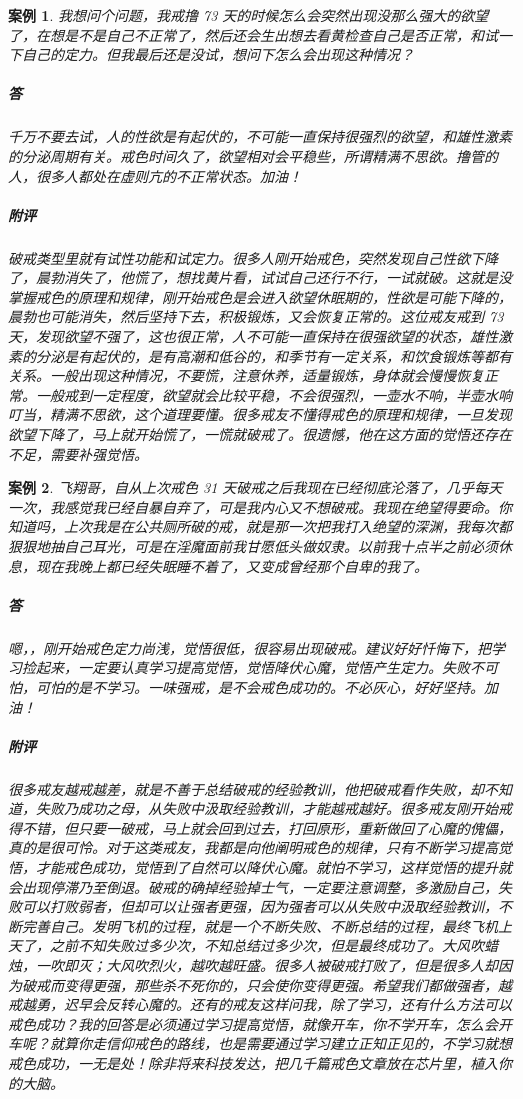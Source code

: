\documentclass{ctexart}
\newtheorem{case}{案例}
\begin{document}
\begin{case}
    我想问个问题，我戒撸 73 天的时候怎么会突然出现没那么强大的欲望了，在想是不是自己不正常了，然后还会生出想去看黄检查自己是否正常，和试一下自己的定力。但我最后还是没试，想问下怎么会出现这种情况？
    \subparagraph{答} 千万不要去试，人的性欲是有起伏的，不可能一直保持很强烈的欲望，和雄性激素的分泌周期有关。戒色时间久了，欲望相对会平稳些，所谓精满不思欲。撸管的人，很多人都处在虚则亢的不正常状态。加油！
    \subparagraph{附评} 破戒类型里就有试性功能和试定力。很多人刚开始戒色，突然发现自己性欲下降了，晨勃消失了，他慌了，想找黄片看，试试自己还行不行，一试就破。这就是没掌握戒色的原理和规律，刚开始戒色是会进入欲望休眠期的，性欲是可能下降的，晨勃也可能消失，然后坚持下去，积极锻炼，又会恢复正常的。这位戒友戒到 73 天，发现欲望不强了，这也很正常，人不可能一直保持在很强欲望的状态，雄性激素的分泌是有起伏的，是有高潮和低谷的，和季节有一定关系，和饮食锻炼等都有关系。一般出现这种情况，不要慌，注意休养，适量锻炼，身体就会慢慢恢复正常。一般戒到一定程度，欲望就会比较平稳，不会很强烈，一壶水不响，半壶水响叮当，精满不思欲，这个道理要懂。很多戒友不懂得戒色的原理和规律，一旦发现欲望下降了，马上就开始慌了，一慌就破戒了。很遗憾，他在这方面的觉悟还存在不足，需要补强觉悟。
\end{case}

\begin{case}
    飞翔哥，自从上次戒色 31 天破戒之后我现在已经彻底沦落了，几乎每天一次，我感觉我已经自暴自弃了，可是我内心又不想破戒。我现在绝望得要命。你知道吗，上次我是在公共厕所破的戒，就是那一次把我打入绝望的深渊，我每次都狠狠地抽自己耳光，可是在淫魔面前我甘愿低头做奴隶。以前我十点半之前必须休息，现在我晚上都已经失眠睡不着了，又变成曾经那个自卑的我了。
    \subparagraph{答} 嗯，，刚开始戒色定力尚浅，觉悟很低，很容易出现破戒。建议好好忏悔下，把学习捡起来，一定要认真学习提高觉悟，觉悟降伏心魔，觉悟产生定力。失败不可怕，可怕的是不学习。一味强戒，是不会戒色成功的。不必灰心，好好坚持。加油！
    \subparagraph{附评} 很多戒友越戒越差，就是不善于总结破戒的经验教训，他把破戒看作失败，却不知道，失败乃成功之母，从失败中汲取经验教训，才能越戒越好。很多戒友刚开始戒得不错，但只要一破戒，马上就会回到过去，打回原形，重新做回了心魔的傀儡，真的是很可怜。对于这类戒友，我都是向他阐明戒色的规律，只有不断学习提高觉悟，才能戒色成功，觉悟到了自然可以降伏心魔。就怕不学习，这样觉悟的提升就会出现停滞乃至倒退。破戒的确掉经验掉士气，一定要注意调整，多激励自己，失败可以打败弱者，但却可以让强者更强，因为强者可以从失败中汲取经验教训，不断完善自己。发明飞机的过程，就是一个不断失败、不断总结的过程，最终飞机上天了，之前不知失败过多少次，不知总结过多少次，但是最终成功了。大风吹蜡烛，一吹即灭；大风吹烈火，越吹越旺盛。很多人被破戒打败了，但是很多人却因为破戒而变得更强，那些杀不死你的，只会使你变得更强。希望我们都做强者，越戒越勇，迟早会反转心魔的。还有的戒友这样问我，除了学习，还有什么方法可以戒色成功？我的回答是必须通过学习提高觉悟，就像开车，你不学开车，怎么会开车呢？就算你走信仰戒色的路线，也是需要通过学习建立正知正见的，不学习就想戒色成功，一无是处！除非将来科技发达，把几千篇戒色文章放在芯片里，植入你的大脑。
\end{case}
\end{document}
